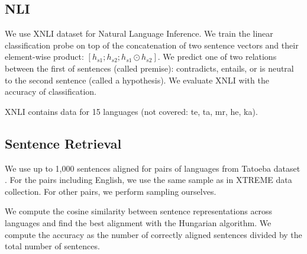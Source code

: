 \subsection{NLI}

We use XNLI dataset \cite{conneau_xnli_2018} for Natural Language Inference. We train the linear classification probe on top of the concatenation of two sentence vectors and their element-wise product: $[h_{s1}; h_{s2}; h_{s1} \odot h_{s2}]$. We predict one of two relations between the first of sentences (called premise): contradicts, entails, or is neutral to the second sentence (called a hypothesis). We evaluate XNLI with the accuracy of classification.

XNLI contains data for 15 languages (not covered: te, ta, mr, he, ka).

\subsection{Sentence Retrieval}
We use up to 1,000 sentences aligned for pairs of languages from Tatoeba dataset \cite{artetxe_massively_2019}. For the pairs including English, we use the same sample as in XTREME data collection. For other pairs, we perform sampling ourselves. 

We compute the cosine similarity between sentence representations across languages and find the best alignment with the Hungarian algorithm\cite{kuhn_hungarian_1955}. We compute the accuracy as the number of correctly aligned sentences divided by the total number of sentences.
